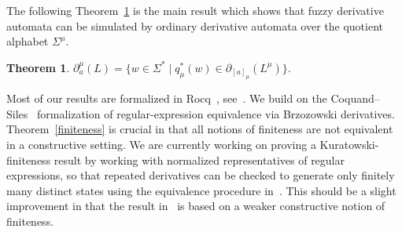 \documentclass{easychair}
\newtheorem{theorem}{Theorem}
\begin{document}
The following Theorem~\ref{main} is the main result which shows that fuzzy derivative automata can be simulated by ordinary derivative
automata over the quotient alphabet $\Sigma^\mu$. 


\begin{theorem}\label{main}
$
\partial_a^\mu(L)
=
\{w\in\Sigma^\ast\mid
q_\mu^\ast(w)\in
\partial_{[a]_\mu}(L^\mu)\}.
$
\end{theorem}


Most of our results are formalized in Rocq~\cite{Rocq}, see~\cite{OurRocqRepo}. We build on the Coquand--Siles~\cite{CoquandRegexEquality,RocqRegexpBrzozowski} formalization of
regular-expression equivalence via Brzozowski derivatives. Theorem~\ref{finiteness} is crucial in that all notions of finiteness are not equivalent in a constructive setting. We are currently working on proving a Kuratowski-finiteness result by working with normalized representatives of regular
expressions, so that repeated derivatives can be checked to generate only finitely many distinct
states using the equivalence procedure in~\cite{CoquandRegexEquality}. This should be a slight improvement in that the result in~\cite{CoquandRegexEquality} is based on a weaker constructive notion of finiteness.





\end{document}
